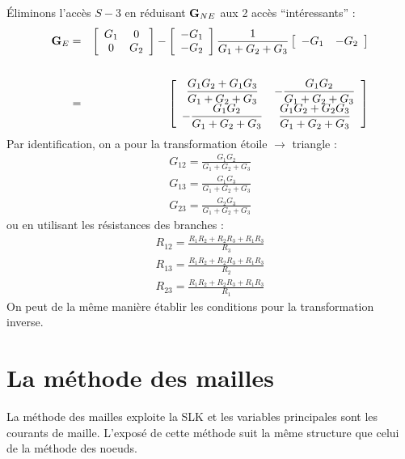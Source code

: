 \begin{testexample}
Éliminons l'accès $S-3$ en réduisant ${\bf G}_{NE}$ aux 2 accès
``intéressants'' : 
\begin{eqnarray*}
	{\bf G}_E &=&
	\left[
	\begin{array}{cc}
		G_1 & 0\\ 0 & G_2
	\end{array} \right] - \left[
	\begin{array}{c}
		-G_1 \\-G_2
	\end{array}\right] \frac{1}{G_1+G_2+G_3} \left[
	\begin{array}{cc}
		-G_1 & -G_2
	\end{array}\right] \\[6mm] & = & \left[ 
	\begin{array}{cc}\displaystyle 
		\frac{G_1G_2+G_1G_3}{G_1+G_2+G_3} & \displaystyle 
		-\frac{G_1G_2}{G_1+G_2+G_3}\\\displaystyle 
		-\frac{G_1G_2}{G_1+G_2+G_3} & \displaystyle \frac{G_1G_2+G_2G_3}{G_1+G_2+G_3} 
	\end{array}\right]
\end{eqnarray*}
Par identification, on a  pour la transformation étoile $\rightarrow$ triangle :
\[\begin{array}{c}
G_{12}=\frac{G_1G_2}{G_1+G_2+G_3}\\[4mm]
G_{13}=\frac{G_1G_3}{G_1+G_2+G_3}\\[4mm]
G_{23}=\frac{G_2G_3}{G_1+G_2+G_3}
\end{array}\]
ou en utilisant les résistances des branches : 
\[\begin{array}{c}
R_{12}=\frac{R_1R_2+R_2R_3+R_1R_3}{R_3}\\[4mm]
R_{13}=\frac{R_1R_2+R_2R_3+R_1R_3}{R_2}\\[4mm]
R_{23}=\frac{R_1R_2+R_2R_3+R_1R_3}{R_1}
\end{array} \]
On peut de la même manière établir les conditions pour la transformation inverse.
\end{testexample}

\section{La méthode des mailles}
\label{sec:MM}

La méthode des mailles exploite la SLK et les variables principales sont les courants de maille. L'exposé de cette méthode suit la même structure que celui de la méthode des noeuds.


